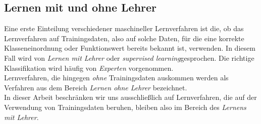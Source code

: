 \documentclass[fontsize=11pt]{scrartcl}
\begin{document}
            \subsection{Lernen mit und ohne Lehrer}
                Eine erste Einteilung verschiedener maschineller Lernverfahren ist die, ob das Lernverfahren auf Trainingsdaten, also auf solche Daten, für die eine korrekte Klasseneinordnung oder Funktionswert bereits bekannt ist, verwenden. In diesem Fall wird von \emph{Lernen mit Lehrer} oder \emph{supervised learning}gesprochen. Die richtige Klassifikation wird häufig von \emph{Experten} vorgenommen.\cite{ertel2016}
                \\
                Lernverfahren, die hingegen \emph{ohne} Trainingsdaten auskommen werden als Verfahren aus dem Bereich \emph{Lernen ohne Lehrer} bezeichnet.\\
                In dieser Arbeit beschränken wir uns ausschließlich auf Lernverfahren, die auf der Verwendung von Trainingsdaten beruhen, bleiben also im Bereich des \emph{Lernens mit Lehrer}.
\end{document}
